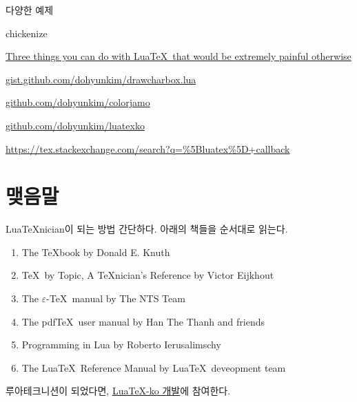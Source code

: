 \documentclass[t,10pt]{beamer}
\begin{document}
\let\tempone\itemize
\let\temptwo\enditemize
\renewenvironment{itemize}{\tempone\addtolength{\itemsep}{0.5\baselineskip}}
                 {\temptwo}
\begin{frame}[fragile]{다양한 예제}
  \begin{itemize}
  \item {\rainbowcolor{}
    chickenize\par\unrainbowcolor}
  \item \href{https://www.tug.org/TUGboat/tb31-3/tb99isambert.pdf}%
    {\alert{Three things you can do with Lua\TeX\ that would be extremely %
        painful otherwise}}
  \item \href{https://gist.github.com/dohyunkim/cde58679facb606a01a9\#file-drawcharbox-lua-L56-L77}%
    {gist.github.com/dohyunkim/drawcharbox.lua}
  \item \href{https://github.com/dohyunkim/colorjamo/blob/master/colorjamo.lua\#L110-L138}%
    {github.com/dohyunkim/colorjamo}
  \item \href{https://github.com/dohyunkim/luatexko}%
    {github.com/dohyunkim/luatexko}
  \item \href{https://tex.stackexchange.com/search?q=\%5Bluatex\%5D+callback}%
    {https://tex.stackexchange.com/search?q=\%5Bluatex\%5D+callback}
  \end{itemize}
\end{frame}

\section{맺음말}

\begin{frame}[fragile]{Lua\TeX nician이 되는 방법}
  간단하다. 아래의 책들을 순서대로 읽는다.
  \begin{enumerate}
  \item \alert{The \TeX book} by Donald E. Knuth
  \item \alert{\TeX\ by Topic, A \TeX nician's Reference} by Victor Eijkhout
  \item \alert{The $\varepsilon$-\TeX\ manual} by The NTS Team
  \item \alert{The pdf\TeX\ user manual} by Han The Thanh and friends
  \item \alert{Programming in Lua} by Roberto Ierusalimschy
  \item \alert{The Lua\TeX\ Reference Manual} by Lua\TeX\ deveopment team
  \end{enumerate}

  루아테크니션이 되었다면, \alert{\href{http://github.com/dohyun/luatexko}%
  {Lua\TeX-ko 개발}}에 참여한다.
\end{frame}
\end{document}

